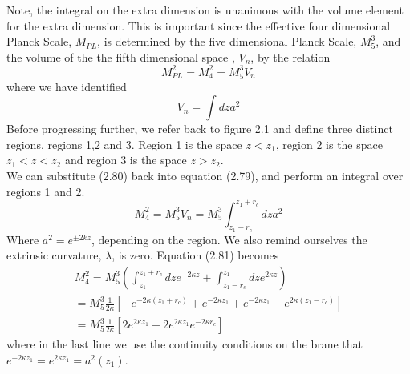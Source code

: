 \documentclass[11pt]{report}
\numberwithin{equation}{chapter}
\begin{document}
Note, the integral on the extra dimension is unanimous with the volume element for the extra dimension. This is important since the effective four dimensional Planck Scale, $M_{PL}$, is determined by the five dimensional Planck Scale, $M^3_5$, and the volume of the the fifth dimensional space \cite{RS1}, $V_n$, by the relation 
\begin{equation}
    M_{PL}^{2} = M^2_4 = M_{5}^3V_n 
\end{equation}
where we have identified
\begin{equation}
    V_n = \int dza^2
\end{equation}
Before progressing further, we refer back to figure 2.1 and define three distinct regions, regions 1,2 and 3. Region 1 is the space $z<z_1$, region 2 is the space $z_1<z<z_2$ and region 3 is the space $z>z_2$.\\
We can substitute (2.80) back into equation (2.79), and perform an integral over regions 1 and 2.
\begin{equation}
    M^2_4 = M_5^3V_n = M^3_5\int^{z_1 + r_c}_{z_1 - r_c}dza^2
\end{equation}
Where $a^2 = e^{\pm2kz}$, depending on the region. We also remind ourselves the extrinsic curvature, $\lambda$, is zero. Equation (2.81) becomes
\begin{equation}
    \begin{aligned}
        M^2_4 = M^3_5(\int^{z_1 + r_c}_{z_1}dze^{-2\kappa z} + \int^{z_1}_{z_1 - r_c}dze^{2\kappa z}) \\
        = M^3_5\frac{1}{2\kappa}[-e^{-2\kappa(z_1+r_c)}+e^{-2\kappa z_1}+e^{-2\kappa z_1}-e^{2\kappa (z_1 -r_c)}] \\
        = M^3_5\frac{1}{2\kappa}[2e^{2\kappa z_1} -2e^{2\kappa z_1}e^{-2\kappa r_c}]
    \end{aligned}
\end{equation}
where in the last line we use the continuity conditions on the brane that $e^{-2\kappa z_1} = e^{2\kappa z_1} = a^2(z_1)$.
\end{document}
